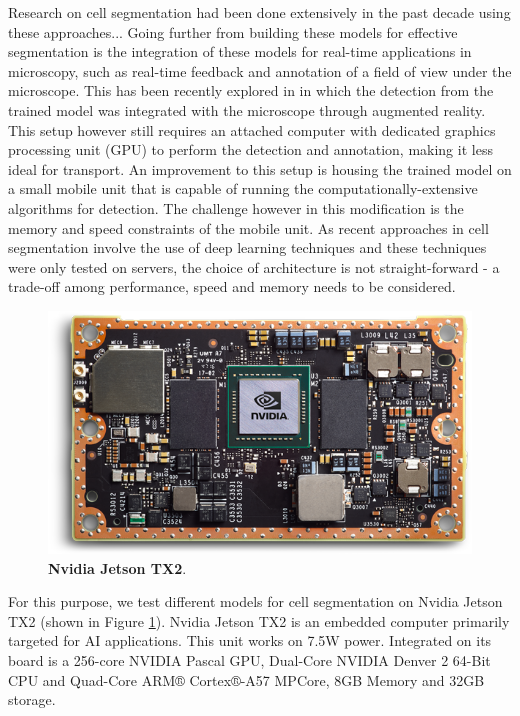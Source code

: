 \documentclass[journal]{IEEEtran}
\begin{document}
Research on cell segmentation had been done extensively in the past decade using these approaches...
Going further from building these models for effective segmentation is the integration of these models for real-time applications in microscopy, such as real-time feedback and annotation of a field of view under the microscope. This has been recently explored in \cite{Waithe544833} in which the detection from the trained model was integrated with the microscope through augmented reality. This setup however still requires an attached computer with dedicated graphics processing unit (GPU) to perform the detection and annotation, making it less ideal for transport. %
An improvement to this setup is housing the trained model on a small mobile unit that is capable of running the computationally-extensive algorithms for detection. The challenge however in this modification is the memory and speed constraints of the mobile unit. As recent approaches in cell segmentation involve the use of deep learning techniques and these techniques were only tested on servers, the choice of architecture is not straight-forward - a trade-off among performance, speed and memory needs to be considered.

\begin{figure}
\includegraphics[width=\linewidth]{jetson.png}
\caption{\textbf{Nvidia Jetson TX2}.}
\label{fig:jetson}
\end{figure}
For this purpose, we test different models for cell segmentation on Nvidia Jetson TX2 \cite{jetson} (shown in Figure \ref{fig:jetson}). Nvidia Jetson TX2 is an embedded computer primarily targeted for AI applications. This unit works on 7.5W power. Integrated on its board is a 256-core NVIDIA Pascal GPU, Dual-Core NVIDIA Denver 2 64-Bit CPU and Quad-Core ARM® Cortex®-A57 MPCore, 8GB Memory and 32GB storage.
\end{document}
